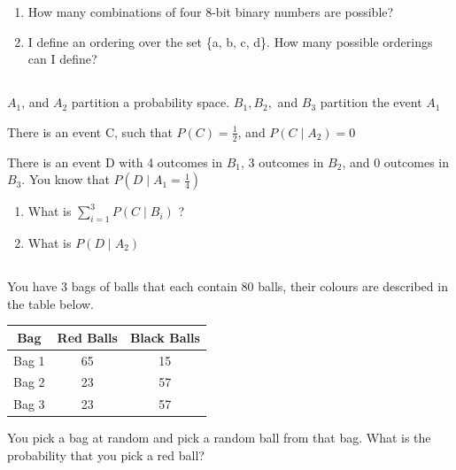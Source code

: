 \documentclass[twocolumn]{article}
\begin{document}
    \begin{enumerate}
        \item How many combinations of four 8-bit binary numbers are possible?
        \item I define an ordering over the set \{a, b, c, d\}. How many possible orderings can I define?
    \end{enumerate}

\subsection{}

    $A_1$, and $A_2$ partition a probability space. $B_1, B_2,$ and $B_3$ partition the event $A_1$

    There is an event C, such that $P(C) = \frac{1}{2}$, and $P(C \mid A_2) = 0$
    
    There is an event D with 4 outcomes in $B_1$, 3 outcomes in $B_2$, and 0 outcomes in $B_3$. You know that $P (D \mid A_1 = \frac{1}{4})$

    \begin{enumerate}
        \item What is $\sum_{i=1}^3 P(C \mid B_i) $ ?
        \item What is $P(D \mid A_2)$
    \end{enumerate}
    
\subsection{}

    You have 3 bags of balls that each contain 80 balls, their colours are described in the table below.

    \begin{table}[h!]
        \centering
        \begin{tabular}{c | c | c }
            \toprule
            Bag & Red Balls & Black Balls \\
            \midrule
            Bag 1 & 65 & 15  \\
            Bag 2 & 23 & 57  \\
            Bag 3 & 23 & 57 \\
            \bottomrule
        \end{tabular}
    \end{table}

    You pick a bag at random and pick a random ball from that bag. What is the probability that you pick a red ball?
\end{document}
